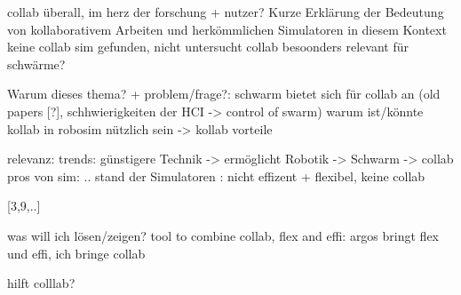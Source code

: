 \documentclass[german,version-2020-11]{uzl-thesis}
\begin{document}
%  
%  
%
%


collab überall, im herz der forschung + nutzer? 
      Kurze Erklärung der Bedeutung von kollaborativem Arbeiten und herkömmlichen Simulatoren in diesem Kontext
        keine collab sim gefunden, nicht untersucht
      collab besoonders relevant für schwärme?



\begin{Code}
  
   Warum dieses thema? + problem/frage?:
    schwarm bietet sich für collab an  (old papers [?], schhwierigkeiten der HCI -> control of swarm)
    warum ist/könnte kollab in robosim nützlich sein -> kollab vorteile
  
  relevanz:
    trends: günstigere Technik -> ermöglicht Robotik -> Schwarm -> collab
    pros von sim: ..
    stand der Simulatoren : nicht effizent + flexibel, keine collab
    
    [3,9,..]
  
  was will ich lösen/zeigen?
    tool to combine collab, flex and effi:
      argos bringt flex und effi,
      ich bringe collab

    hilft colllab?

  
\end{Code}
\end{document}
